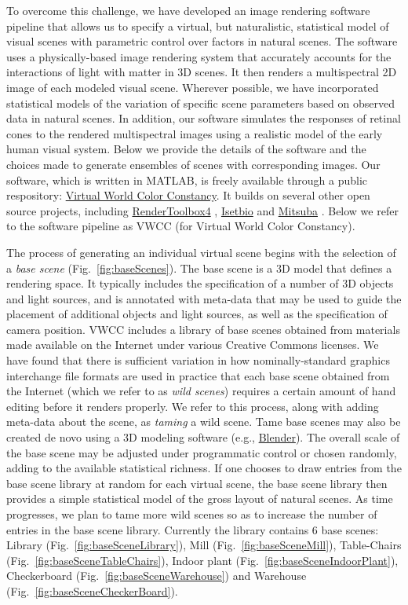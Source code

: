 \documentclass{jov}
\begin{document}
To overcome this  challenge, we have developed an image rendering software pipeline that allows us to specify a virtual, but naturalistic, statistical model of visual scenes with parametric control over factors in natural scenes. The software uses a physically-based image rendering system that accurately accounts for the interactions of light with matter in 3D scenes. It then renders a multispectral 2D image of each modeled visual scene. Wherever possible, we have incorporated statistical models of the variation of specific scene parameters based on observed data in natural scenes. In addition, our software simulates the responses of retinal cones to the rendered multispectral images using a realistic model of the early human visual system. Below we provide the details of the software and the choices made to generate ensembles of scenes with corresponding images. Our software, which is written in MATLAB, is freely available through a public respository: \href{https://github.com/BrainardLab/VirtualWorldColorConstancy}{Virtual World Color Constancy}. It builds on several other open source projects, including \href{http://rendertoolbox.org}{RenderToolbox4} \cite{heasly2014rendertoolbox3}, \href{http://isetbio.org}{Isetbio} and \href{https://www.mitsuba-renderer.org}{Mitsuba} \cite{jakob2015mitsuba}. Below we refer to the software pipeline as VWCC (for Virtual World Color Constancy).

The process of generating an individual virtual scene begins with the selection of a \textit{base scene} (Fig.~\ref{fig:baseScenes}). The base scene is a 3D model that defines a rendering space.  It typically includes the specification of a number of 3D objects and light sources, and is annotated with meta-data that may be used to guide the placement of additional objects and light sources, as well as the specification of camera position. VWCC includes a library of base scenes obtained from materials made available on the Internet under various Creative Commons licenses. We have found that there is sufficient variation in how nominally-standard graphics interchange file formats are used in practice that each base scene obtained from the Internet (which we refer to as \textit{wild scenes}) requires a certain amount of hand editing before it renders properly. We refer to this process, along with adding meta-data about the scene, as \textit{taming} a wild scene. Tame base scenes may also be created de novo using a 3D modeling software (e.g., \href{https://www.blender.org/}{Blender}).  The overall scale of the base scene may be adjusted under programmatic control or chosen randomly, adding to the available statistical richness. If one chooses to draw entries from the base scene library at random for each virtual scene, the base scene library then provides a simple statistical model of the gross layout of natural scenes. As time progresses, we plan to tame more wild scenes so as to increase the number of entries in the base scene library. Currently the library contains 6 base scenes: Library (Fig.~\ref{fig:baseSceneLibrary}), Mill (Fig.~\ref{fig:baseSceneMill}), Table-Chairs (Fig.~\ref{fig:baseSceneTableChairs}), Indoor plant (Fig.~\ref{fig:baseSceneIndoorPlant}), Checkerboard (Fig.~\ref{fig:baseSceneWarehouse}) and Warehouse (Fig.~\ref{fig:baseSceneCheckerBoard}).
\end{document}
